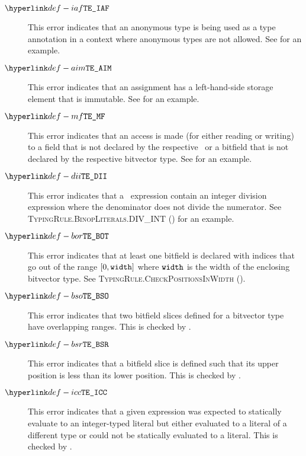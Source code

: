 \begin{description}
\hypertarget{def-iaf}{}
\item[$\AnnonymousFormNotAllowedHere$]
This error indicates that an anonymous type is being used as a type annotation in a context
where anonymous types are not allowed.
See  for an example.

\hypertarget{def-aim}{}
\item[$\AssignmentToImmutable$]
This error indicates that an assignment has a left-hand-side storage element that is immutable.
See  for an example.

\hypertarget{def-mf}{}
\item[$\MissingField$]
This error indicates that an access is made (for either reading or writing) to a field that is
not declared by the respective \structuredtype\ or a bitfield that is not declared by the respective
bitvector type.
See  for an example.

\hypertarget{def-dii}{}
\item[$\DivIntIndivisible$]
This error indicates that a \staticallyevaluable\ expression contain an integer division expression where
the denominator does not divide the numerator.
See \textsc{TypingRule.BinopLiterals.DIV\_INT} () for an example.

\hypertarget{def-bot}{}
\item[$\BitfieldsOutOfRange$]
This error indicates that at least one bitfield is declared with indices that go out of the range
$[0, \texttt{width}]$ where $\texttt{width}$ is the width of the enclosing bitvector type.
See \textsc{TypingRule.CheckPositionsInWidth} ().

\hypertarget{def-bso}{}
\item[$\BitfieldSlicesOverlap$]
This error indicates that two bitfield slices defined for a bitvector type have overlapping ranges.
This is checked by .

\hypertarget{def-bsr}{}
\item[$\BitfieldSliceReversed$]
This error indicates that a bitfield slice is defined such that its upper position is less than its lower position.
This is checked by .

\hypertarget{def-icc}{}
\item[$\IntConstantExpected$]
This error indicates that a given expression was expected to statically evaluate
to an integer-typed literal but either evaluated to a literal of a different type
or could not be statically evaluated to a literal.
This is checked by .


\end{description}
